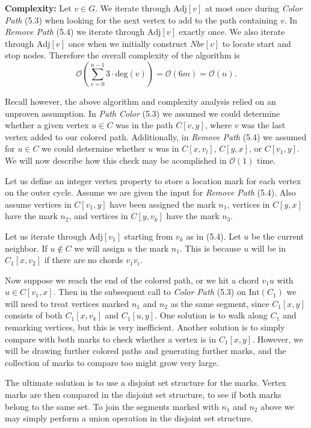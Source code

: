\documentclass[letterpaper, 12pt]{article}
\theoremstyle{definition}
\theoremstyle{definition}
\theoremstyle{thm}
\theoremstyle{definition}
\begin{document}
\noindent\textbf{Complexity:} Let $v\in G$. We iterate through $\text{Adj}[v]$
at most once during \textit{Color Path} (5.3) when looking for the next vertex
to add to the path containing $v$. In \textit{Remove Path} (5.4) we iterate through
$\text{Adj}[v]$ exactly once. We also iterate through $\text{Adj}[v]$ once
when we initially construct $\textit{Nbr}[v]$ to locate start and stop nodes.
Therefore the overall complexity of the algorithm is
\[
    \mathcal{O}\left(\sum_{v=0}^{n-1}3\cdot\text{deg}(v)\right)
        =\mathcal{O}(6m)=\mathcal{O}(n).
\]

Recall however, the above algorithm and complexity analysis relied on an
unproven assumption. In \textit{Path Color} (5.3) we assumed we could determine
whether a given vertex $u\in C$ was in the path $C[v,y]$, where $v$ was the
last vertex added to our colored path. Additionally, in \textit{Remove Path}
(5.4) we assumed for $u\in C$ we could determine whether $u$ was in $C[x,v_l]$,
$C[y,x]$, or $C[v_1,y]$. We will now describe how this check may be acomplished
in $\mathcal{O}(1)$ time.

Let us define an integer vertex property to store a location mark for each
vertex on the outer cycle. Assume we are given the input for \textit{Remove
Path} (5.4). Also assume vertices in $C[v_1,y]$ have been assigned the mark $n_1$,
vertices in $C[y,x]$ have the mark $n_2$, and vertices in $C[y,v_k]$ have
the mark $n_3$.

Let us iterate through $\text{Adj}[v_1]$ starting from $v_k$ as in (5.4). Let
$u$ be the current neighbor. If $u\not\in C$ we will assign $u$ the mark $n_1$.
This is because $u$ will be in $C_1[x,v_2]$ if there are no chords $v_1v_i$.

Now suppose we reach the end of the colored path, or we hit a chord $v_1u$ with
$u\in C[v_1,x]$. Then in the subsequent call to \textit{Color Path} (5.3) on
$\text{Int}(C_1)$ we will need to treat vertices marked $n_1$ and $n_2$ as the
same segment, since $C_1[x,y]$ consists of both $C_1[x,v_k]$ and $C_1[u,y]$.
One solution is to walk along $C_1$ and remarking vertices, but this is very
inefficient. Another solution is to simply compare with both marks to check
whether a vertex is in $C_1[x,y]$. However, we will be drawing further colored
paths and generating further marks, and the collection of marks to compare too
might grow very large.

The ultimate solution is to use a disjoint set structure for the marks. Vertex
marks are then compared in the disjoint set structure, to see if both marks
belong to the same set. To join the segments marked with $n_1$ and $n_2$ above
we may simply perform a union operation in the disjoint set structure.
\end{document}
